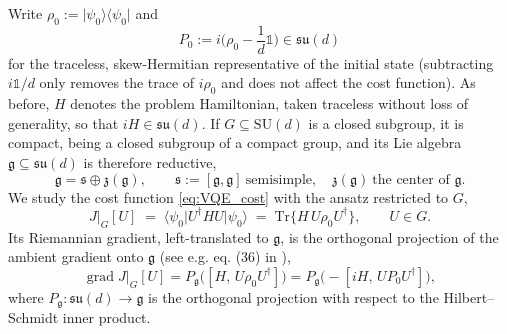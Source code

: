 \documentclass{article}
\begin{document}
Write $\rho_0 := \lvert\psi_0\rangle\langle\psi_0\rvert$ and
\begin{equation}
P_0 := i\Big(\rho_0 - \frac{1}{d}\mathds{1}\Big) \in \mathfrak{su}(d)
\end{equation}
for the traceless, skew-Hermitian representative of the initial state (subtracting $i\mathds{1}/d$ only removes the trace of $i\rho_0$ and does not affect the cost function).
As before, $H$ denotes the problem Hamiltonian, taken traceless without loss of generality, so that $iH\in\mathfrak{su}(d)$.
If $G\subseteq \mathrm{SU}(d)$ is a closed subgroup, it is compact, being a closed subgroup of a compact group, and its Lie algebra $\mathfrak g\subseteq\mathfrak{su}(d)$ is therefore reductive,
\begin{equation}
\mathfrak g = \mathfrak s \oplus \mathfrak z(\mathfrak g), \qquad \mathfrak s := [\mathfrak g,\mathfrak g] \ \text{semisimple}, \quad \mathfrak z(\mathfrak g) \ \text{the center of } \mathfrak g.
\end{equation}
We study the cost function \eqref{eq:VQE_cost} with the ansatz restricted to $G$,
\begin{equation}
J\vert_G[U] \;=\; \langle\psi_0\vert U^\dagger H U\vert\psi_0\rangle \;=\; \mathrm{Tr}\{H\, U\rho_0 U^\dagger\}, \qquad U\in G .
\end{equation}
Its Riemannian gradient, left-translated to $\mathfrak g$, is the orthogonal projection of the ambient gradient onto $\mathfrak g$ (see e.g. eq. (36) in \cite{schulte2010gradient}),
\begin{equation}
\label{eq:projected-grad}
\operatorname{grad} J\vert_G[U] = P_{\mathfrak g}\big([H,\, U\rho_0 U^\dagger]\big) = P_{\mathfrak g}\big(-[iH,\,  U P_0 U^\dagger]\big),
\end{equation}
where $P_{\mathfrak g}:\mathfrak{su}(d)\to\mathfrak g$ is the orthogonal projection with respect to the Hilbert--Schmidt inner product.
\end{document}
